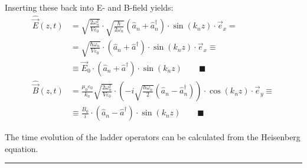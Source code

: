 \documentclass{article}
\newcommand{\lr}[1]{\left(#1\right)}
\begin{document}
{	Inserting these back into E- and B-field yields:
		\begin{align*}
			\hat{\vec{E}}(z,t) &= \sqrt{ \frac{2\omega_n^2}{V\varepsilon_0} } \cdot \sqrt{ \frac{\hbar}{2\omega_n} } \lr{ \hat{a}_n + \hat{a}^\dagger_n } \cdot \sin(k_n z) \cdot \vec{e}_x = \\
			&= \sqrt{ \frac{ \hbar\omega_n }{V \varepsilon_0 } } \cdot ( \hat{a}_n + \hat{a}^\dagger ) \cdot \sin(k_n z) \cdot \vec{e}_x \equiv \\
			&\equiv \vec{E}_0 \cdot ( \hat{a}_n + \hat{a}^\dagger ) \cdot \sin(k_n z) \qquad \blacksquare \\
			\hat{\vec{B}}(z,t) &= \frac{ \mu_0 \varepsilon_0 }{k_n} \sqrt{ \frac{2\omega_n^2}{V\varepsilon_0} } \cdot \lr{ -i\sqrt{ \frac{\hbar\omega_n}{2} } \lr{ \hat{a}_n - \hat{a}^\dagger_n } } \cdot \cos(k_n z) \cdot \vec{e}_y \equiv \\
			&\equiv \frac{B_0}{i} \cdot (\hat{a}_n - \hat{a}^\dagger) \cdot \sin(k_n z) \qquad \blacksquare
		\end{align*}
	
	The time evolution of the ladder operators can be calculated from the Heisenberg equation.
	

\hrule
}


\newpage
\end{document}
